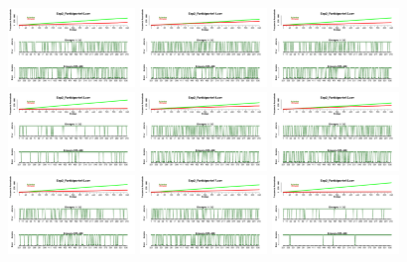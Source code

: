 \begin{figure}[th]
\includegraphics[width=0.30\textwidth]{Figures/Success_Exp2_P10} \includegraphics[width=0.30\textwidth]{Figures/Success_Exp2_P11} \includegraphics[width=0.30\textwidth]{Figures/Success_Exp2_P12}
\includegraphics[width=0.30\textwidth]{Figures/Success_Exp2_P13} \includegraphics[width=0.30\textwidth]{Figures/Success_Exp2_P14} \includegraphics[width=0.30\textwidth]{Figures/Success_Exp2_P15}
\includegraphics[width=0.30\textwidth]{Figures/Success_Exp2_P16} \includegraphics[width=0.30\textwidth]{Figures/Success_Exp2_P17} \includegraphics[width=0.30\textwidth]{Figures/Success_Exp2_P18}

\end{figure}
